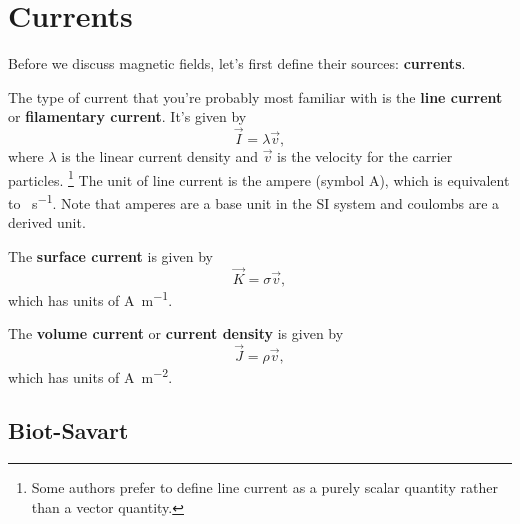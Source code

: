 \chapter{Currents}

Before we discuss magnetic fields,
let's first define their sources: \textbf{currents}.

The type of current that you're probably most familiar with is the
\textbf{line current} or \textbf{filamentary current}.
It's given by
\begin{equation}
    \vec{I} = \lambda \vec{v},
\end{equation}
where \(\lambda\) is the linear current density
and \(\vec{v}\) is the velocity for the carrier particles.
\footnote{
    Some authors prefer to define line current as a purely scalar quantity
    rather than a vector quantity.
}
The unit of line current is the ampere (symbol \unit{\A}),
which is equivalent to \unit{\C \per \s}.
Note that amperes are a base unit in the SI system
and coulombs are a derived unit.

The \textbf{surface current} is given by
\begin{equation}
    \vec{K} = \sigma \vec{v},
\end{equation}
which has units of \unit{\A \per \m}.

The \textbf{volume current} or \textbf{current density} is given by
\begin{equation}
    \vec{J} = \rho \vec{v},
\end{equation}
which has units of \unit{\A \per \m\squared}.

\section{Biot-Savart}
